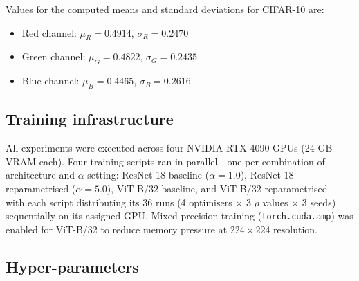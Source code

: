 \documentclass{article}
\begin{document}
Values for the computed means and standard deviations for CIFAR-10 are:
\begin{itemize}
    \item Red channel: $\mu_R = 0.4914$, $\sigma_R = 0.2470$
    \item Green channel: $\mu_G = 0.4822$, $\sigma_G = 0.2435$
    \item Blue channel: $\mu_B = 0.4465$, $\sigma_B = 0.2616$
\end{itemize}

\subsection{Training infrastructure}
\label{appendix:infrastructure}
All experiments were executed across four NVIDIA RTX 4090 GPUs (24 GB VRAM each). Four training scripts ran in parallel—one per combination of architecture and $\alpha$ setting: ResNet-18 baseline ($\alpha=1.0$), ResNet-18 reparametrised ($\alpha=5.0$), ViT-B/32 baseline, and ViT-B/32 reparametrised—with each script distributing its 36 runs (4 optimisers $\times$ 3 $\rho$ values $\times$ 3 seeds) sequentially on its assigned GPU. Mixed-precision training (\texttt{torch.cuda.amp}) was enabled for ViT-B/32 to reduce memory pressure at $224\times224$ resolution.

\subsection{Hyper-parameters}
\label{appendix:hyperparameters}
\end{document}
